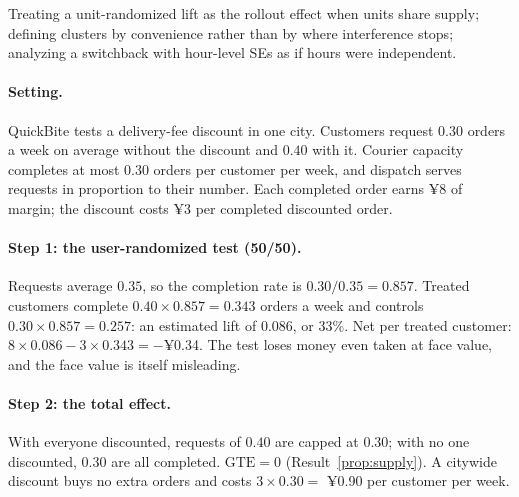 \documentclass[11pt]{article}
\begin{document}
\begin{pitfall}
Treating a unit-randomized lift as the rollout effect when units share supply; defining clusters by convenience
rather than by where interference stops; analyzing a switchback with hour-level SEs as if hours were independent.
\end{pitfall}

\sectiontwo

\paragraph{Setting.} QuickBite tests a delivery-fee discount in one city. Customers request $0.30$ orders a week on average
without the discount and $0.40$ with it. Courier capacity completes at most $0.30$ orders per customer per week, and
dispatch serves requests in proportion to their number. Each completed order earns ¥8 of margin; the discount costs
¥3 per completed discounted order.

\paragraph{Step 1: the user-randomized test (50/50).} Requests average $0.35$, so the completion rate is
$0.30/0.35 = 0.857$. Treated customers complete $0.40 \times 0.857 = 0.343$ orders a week and controls
$0.30 \times 0.857 = 0.257$: an estimated lift of $0.086$, or 33\%. Net per treated customer:
$8 \times 0.086 - 3 \times 0.343 = -$¥0.34. The test loses money even taken at face value, and the face value is itself
misleading.

\paragraph{Step 2: the total effect.} With everyone discounted, requests of $0.40$ are capped at $0.30$; with no one
discounted, $0.30$ are all completed. $\text{GTE} = 0$ (Result~\ref{prop:supply}). A citywide discount buys no extra
orders and costs $3 \times 0.30 = $ ¥0.90 per customer per week.
\end{document}
